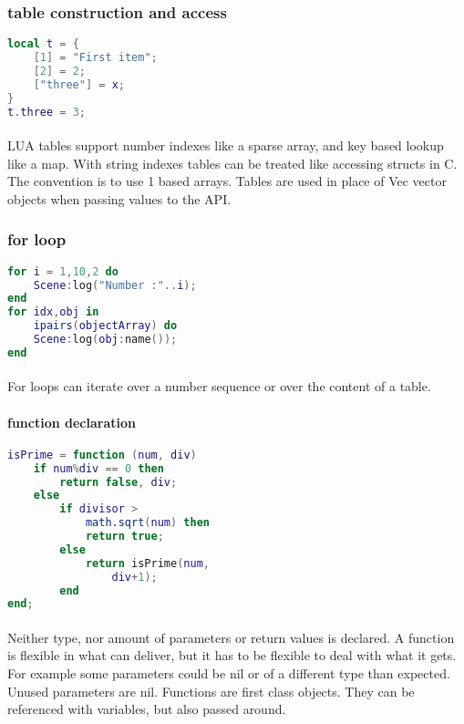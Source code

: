\subsubsection{table construction and access}
\begin{lstlisting}[language=lua]
local t = {
    [1] = "First item";
    [2] = 2;
    ["three"] = x;
}
t.three = 3;
\end{lstlisting}

\paragraph{}
LUA tables support number indexes like a sparse array, and key based lookup like a map.
With string indexes tables can be treated like accessing structs in C.
The convention is to use 1 based arrays.
Tables are used in place of Vec vector objects when passing values to the API.

\subsubsection{for loop}
\begin{lstlisting}[language=lua]
for i = 1,10,2 do
    Scene:log("Number :"..i);
end
for idx,obj in
    ipairs(objectArray) do
    Scene:log(obj:name());
end
\end{lstlisting}

\paragraph{}
For loops can iterate over a number sequence or over the content of a table.

\paragraph{function declaration}
\begin{lstlisting}[language=lua]
isPrime = function (num, div)
    if num%div == 0 then
        return false, div;
    else
        if divisor >
            math.sqrt(num) then
            return true;
        else
            return isPrime(num,
                div+1);
        end
end;
\end{lstlisting}

\paragraph{}
Neither type, nor amount of parameters or return values is declared.
A function is flexible in what can deliver, but it has to be flexible to deal with what it gets.
For example some parameters could be nil or of a different type than expected.
Unused parameters are nil.
Functions are first class objects. They can be referenced with variables, but also passed around.


